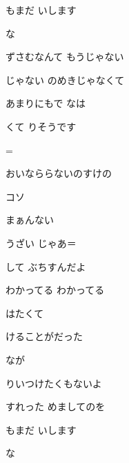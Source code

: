 \documentclass[a4paper,tate,twocolumn,12pt]{ltjtarticle}
\begin{document}
\begin{flushleft}
\begin{minipage}{\linewidth}
もまだ いします

な

ずさむなんて もうじゃない

じゃない のめきじゃなくて

あまりにもで なは

くて りそうです
\end{minipage}

\vspace{2em}

\noindent\begin{minipage}{\linewidth}
=

おいなららないのすけの

コソ

まぁんない

 

うざい じゃあ＝

して ぶちすんだよ
\end{minipage}

\vspace{2em}

\noindent\begin{minipage}{\linewidth}
わかってる わかってる

はたくて

けることがだった

なが

りいつけたくもないよ
\end{minipage}

\vspace{2em}

\noindent\begin{minipage}{\linewidth}
すれった めましてのを

もまだ いします

な 


\end{minipage}
\end{flushleft}
\end{document}
